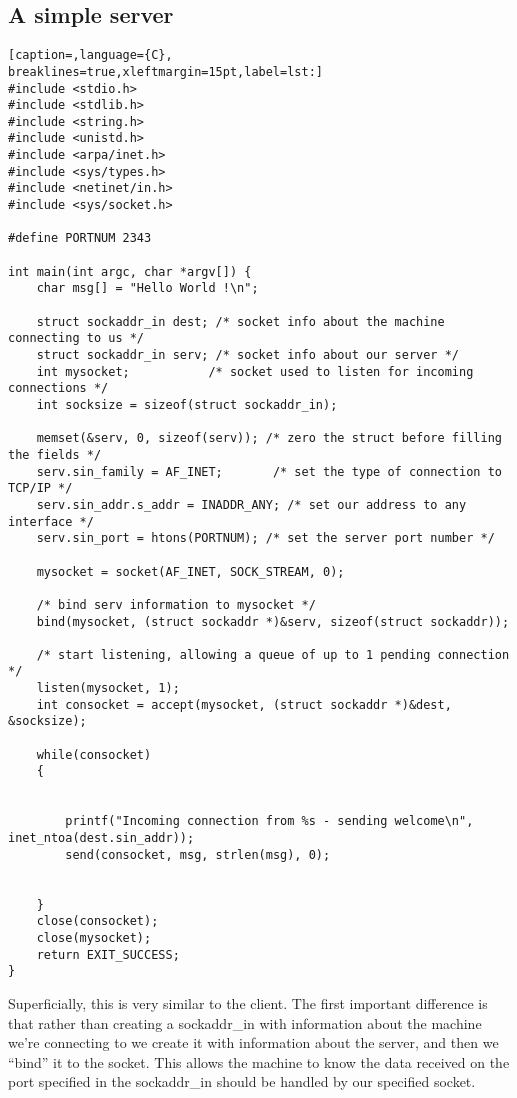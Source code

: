 \subsection{A simple server}
\lstset{basicstyle=\scriptsize, numbers=left, captionpos=b, tabsize=4}
\begin{lstlisting}[caption=,language={C},
breaklines=true,xleftmargin=15pt,label=lst:]
#include <stdio.h>
#include <stdlib.h>
#include <string.h>
#include <unistd.h>
#include <arpa/inet.h>
#include <sys/types.h>
#include <netinet/in.h>
#include <sys/socket.h>

#define PORTNUM 2343

int main(int argc, char *argv[]) {
	char msg[] = "Hello World !\n";
 
	struct sockaddr_in dest; /* socket info about the machine connecting to us */
	struct sockaddr_in serv; /* socket info about our server */
	int mysocket;			/* socket used to listen for incoming connections */
	int socksize = sizeof(struct sockaddr_in);
 
	memset(&serv, 0, sizeof(serv));	/* zero the struct before filling the fields */
	serv.sin_family = AF_INET;		 /* set the type of connection to TCP/IP */
	serv.sin_addr.s_addr = INADDR_ANY; /* set our address to any interface */
	serv.sin_port = htons(PORTNUM);	/* set the server port number */	
 
	mysocket = socket(AF_INET, SOCK_STREAM, 0);
 
	/* bind serv information to mysocket */
	bind(mysocket, (struct sockaddr *)&serv, sizeof(struct sockaddr));
 
	/* start listening, allowing a queue of up to 1 pending connection */
	listen(mysocket, 1);
	int consocket = accept(mysocket, (struct sockaddr *)&dest, &socksize);
 
	while(consocket)
	{
		
 
		printf("Incoming connection from %s - sending welcome\n", inet_ntoa(dest.sin_addr));
		send(consocket, msg, strlen(msg), 0);
 
		
	}
	close(consocket);
	close(mysocket);
	return EXIT_SUCCESS;
}
\end{lstlisting}

Superficially, this is very similar to the client. The first important
difference is that rather than creating a sockaddr\_in with information about
the machine we're connecting to we create it with information about the server,
and then we ``bind'' it to the socket. This allows the machine to know the data
received on the port specified in the sockaddr\_in should be handled by our
specified socket.

